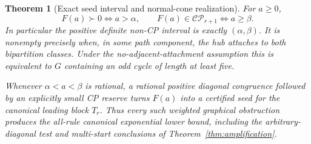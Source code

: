\documentclass[11pt]{article}
\newtheorem{theorem}{Theorem}[section]
\theoremstyle{definition}\newtheorem{definition}[theorem]{Definition}
\theoremstyle{remark}\newtheorem{remark}[theorem]{Remark}
\newcommand{\CP}{\mathcal{CP}}\newcommand{\COP}{\mathcal{COP}}\newcommand{\Ry}{\mathcal R}
\begin{document}
\begin{theorem}[Exact seed interval and normal-cone realization]\label{thm:seedinterval}
For $a\ge0$,
\[
 F(a)\succ0\iff a>\alpha,\qquad
 F(a)\in\CP_{r+1}\iff a\ge\beta.
\]
In particular the positive definite non-CP interval is exactly $(\alpha,\beta)$. It is nonempty precisely when, in some path component, the hub attaches to both bipartition classes. Under the no-adjacent-attachment assumption this is equivalent to $G$ containing an odd cycle of length at least five.

Whenever $\alpha<a<\beta$ is rational, a rational positive diagonal congruence followed by an explicitly small CP reserve turns $F(a)$ into a certified seed for the canonical leading block $T_r$. Thus every such weighted graphical obstruction produces the all-rule canonical exponential lower bound, including the arbitrary-diagonal test and multi-start conclusions of Theorem~\ref{thm:amplification}.
\end{theorem}
\end{document}
